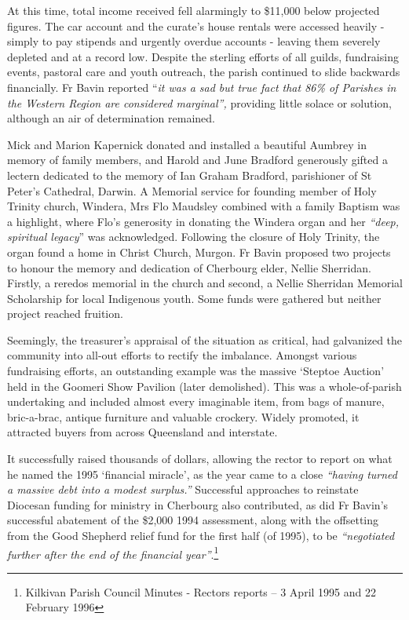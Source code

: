 At this time, total income received fell alarmingly to \$11,000 below projected figures. The car account and the curate's house rentals were accessed heavily - simply to pay stipends and urgently overdue accounts - leaving them severely depleted and at a record low. Despite the sterling efforts of all guilds, fundraising events, pastoral care and youth outreach, the parish continued to slide backwards financially. Fr Bavin reported ``\emph{it was a sad but true fact that 86\% of Parishes in the Western Region are considered marginal'',} providing little solace or solution, although an air of determination remained.



Mick and Marion Kapernick donated and installed a beautiful Aumbrey in memory of family members, and Harold and June Bradford generously gifted a lectern dedicated to the memory of Ian Graham Bradford, parishioner of St Peter's Cathedral, Darwin. A Memorial service for founding member of Holy Trinity church, Windera, Mrs Flo Maudsley combined with a family Baptism was a highlight, where Flo's generosity in donating the Windera organ and her \emph{``deep, spiritual legacy}'' was acknowledged. Following the closure of Holy Trinity, the organ found a home in Christ Church, Murgon. Fr Bavin proposed two projects to honour the memory and dedication of Cherbourg elder, Nellie Sherridan. Firstly, a reredos memorial in the church and second, a Nellie Sherridan Memorial Scholarship for local Indigenous youth. Some funds were gathered but neither project reached fruition.



Seemingly, the treasurer's appraisal of the situation as critical, had galvanized the community into all-out efforts to rectify the imbalance. Amongst various fundraising efforts, an outstanding example was the massive `Steptoe Auction' held in the Goomeri Show Pavilion (later demolished). This was a whole-of-parish undertaking and included almost every imaginable item, from bags of manure, bric-a-brac, antique furniture and valuable crockery. Widely promoted, it attracted buyers from across Queensland and interstate.



It successfully raised thousands of dollars, allowing the rector to report on what he named the 1995 `financial miracle', as the year came to a close \emph{``having turned a massive debt into a modest surplus.''} Successful approaches to reinstate Diocesan funding for ministry in Cherbourg also contributed, as did Fr Bavin's successful abatement of the \$2,000 1994 assessment, along with the offsetting from the Good Shepherd relief fund for the first half (of 1995), to be \emph{``negotiated further after the end of the financial year''}.\footnote{Kilkivan Parish Council Minutes - Rectors reports -- 3 April 1995 and 22 February 1996}








